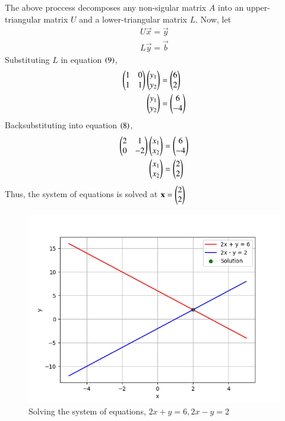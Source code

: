 \documentclass[journal]{IEEEtran}
\begin{document}
The above proccess decomposes any non-sigular matrix $A$ into an upper-triangular matrix $U$ and a lower-triangular matrix $L$.
Now, let
\begin{align}
  U\vec{x} = \vec{y}\\
  L\vec{y} = \vec{b}
\end{align}
Substituting $L$ in equation $\left(9\right)$,
\begin{align}
  \begin{pmatrix}1 & 0 \\ 1 & 1\end{pmatrix}\begin{pmatrix}y_1 \\ y_2\end{pmatrix} &= \begin{pmatrix}6 \\ 2\end{pmatrix}\\
  \begin{pmatrix}y_1 \\ y_2\end{pmatrix} &= \begin{pmatrix}6 \\ -4\end{pmatrix}
\end{align}
Backsubstituting into equation $\left(8\right)$,
\begin{align}
  \begin{pmatrix}2 & 1 \\ 0 & -2\end{pmatrix}\begin{pmatrix}x_1 \\ x_2\end{pmatrix} &= \begin{pmatrix}6 \\ -4\end{pmatrix}\\
  \begin{pmatrix}x_1 \\ x_2\end{pmatrix} &= \begin{pmatrix} 2 \\ 2\end{pmatrix}
\end{align}
Thus, the system of equations is solved at $\mathbf{x} = \begin{pmatrix}2 \\ 2\end{pmatrix}$
\begin{figure}[h!]
   \centering
   \includegraphics[width=1\columnwidth]{figs/fig.png}
   \caption{Solving the system of equations, $2x + y = 6, 2x - y = 2$}
   \label{stemplot}
\end{figure}
\end{document}
